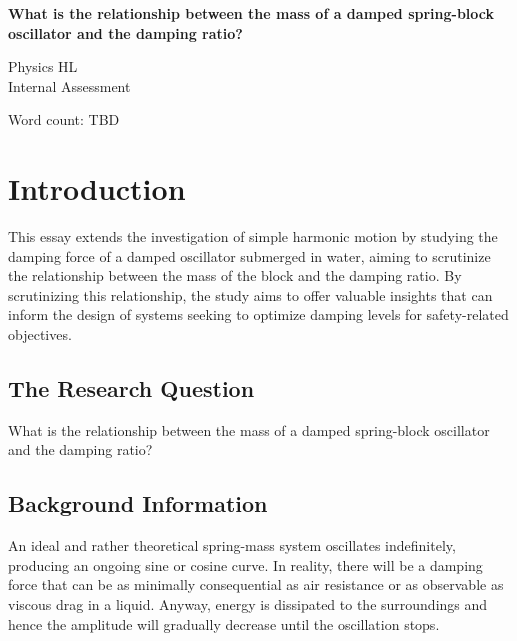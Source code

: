\documentclass[a4paper,12pt]{article}
\begin{document}
\pagestyle{fancy}


\begin{titlepage}
  \begin{center}
    \vspace*{3cm}

    \textbf{\Large  {What is the relationship between the mass of a damped spring-block oscillator and the damping ratio?}}

    \vspace{1cm}
    \large{Physics HL}\\
    \large{Internal Assessment}


    \vfill

    \vspace{1.5cm}

    Word count: TBD

  \end{center}
\end{titlepage}
\pagebreak
\tableofcontents
\pagebreak

\clearpage
\setcounter{page}{1}

\section{Introduction}
This essay extends the investigation of simple harmonic motion by studying the damping force of a damped oscillator submerged in water, aiming to scrutinize the relationship between the mass of the block and the damping ratio. By scrutinizing this relationship, the study aims to offer valuable insights that can inform the design of systems seeking to optimize damping levels for safety-related objectives.


\subsection{The Research Question}
What is the relationship between the mass of a damped spring-block oscillator and the damping ratio?

\subsection{Background Information}
An ideal and rather theoretical spring-mass system oscillates indefinitely, producing an ongoing sine or cosine curve. In reality, there will be a damping force that can be as minimally consequential as air resistance or as observable as viscous drag in a liquid. Anyway, energy is dissipated to the surroundings and hence the amplitude will gradually decrease until the oscillation stops.
\end{document}
